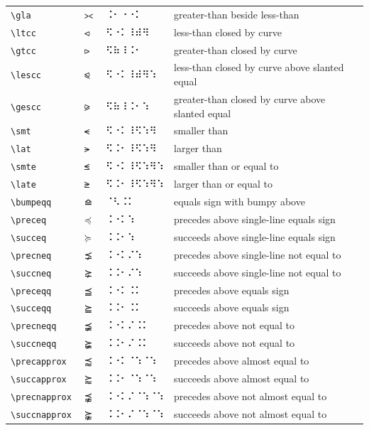 \documentclass[oneside]{article}
\begin{document}
\begin{longtable}{llll}
\verb|\gla| & $\gla$ &   ⠨⠂⠐⠐⠅   & {greater-than beside less-than} \\[2ex]
\verb|\ltcc| & $\ltcc$ &   ⠫⠐⠅⠸⠾⠻   & {less-than closed by curve} \\[2ex]
\verb|\gtcc| & $\gtcc$ &   ⠫⠷⠸⠨⠂   & {greater-than closed by curve} \\[2ex]
\verb|\lescc| & $\lescc$ &   ⠫⠐⠅⠸⠾⠻⠱   & {less-than closed by curve above slanted equal} \\[2ex]
\verb|\gescc| & $\gescc$ &   ⠫⠷⠸⠨⠂⠱   & {greater-than closed by curve above slanted equal} \\[2ex]
\verb|\smt| & $\smt$ &   ⠫⠐⠅⠸⠫⠱⠻   & {smaller than} \\[2ex]
\verb|\lat| & $\lat$ &   ⠫⠨⠂⠸⠫⠱⠻   & {larger than} \\[2ex]
\verb|\smte| & $\smte$ &   ⠫⠐⠅⠸⠫⠱⠻⠱   & {smaller than or equal to} \\[2ex]
\verb|\late| & $\late$ &   ⠫⠨⠂⠸⠫⠱⠻⠱   & {larger than or equal to} \\[2ex]
\verb|\bumpeqq| & $\bumpeqq$ &   ⠈⠣⠨⠅   & {equals sign with bumpy above} \\[2ex]
\verb|\preceq| & $\preceq$ &   ⠨⠐⠅⠱   & {precedes above single-line equals sign} \\[2ex]
\verb|\succeq| & $\succeq$ &   ⠨⠨⠂⠱   & {succeeds above single-line equals sign} \\[2ex]
\verb|\precneq| & $\precneq$ &   ⠨⠐⠅⠌⠱   & {precedes above single-line not equal to} \\[2ex]
\verb|\succneq| & $\succneq$ &   ⠨⠨⠂⠌⠱   & {succeeds above single-line not equal to} \\[2ex]
\verb|\preceqq| & $\preceqq$ &   ⠨⠐⠅⠨⠅   & {precedes above equals sign} \\[2ex]
\verb|\succeqq| & $\succeqq$ &   ⠨⠨⠂⠨⠅   & {succeeds above equals sign} \\[2ex]
\verb|\precneqq| & $\precneqq$ &   ⠨⠐⠅⠌⠨⠅   & {precedes above not equal to} \\[2ex]
\verb|\succneqq| & $\succneqq$ &   ⠨⠨⠂⠌⠨⠅   & {succeeds above not equal to} \\[2ex]
\verb|\precapprox| & $\precapprox$ &   ⠨⠐⠅⠈⠱⠈⠱   & {precedes above almost equal to} \\[2ex]
\verb|\succapprox| & $\succapprox$ &   ⠨⠨⠂⠈⠱⠈⠱   & {succeeds above almost equal to} \\[2ex]
\verb|\precnapprox| & $\precnapprox$ &   ⠨⠐⠅⠌⠈⠱⠈⠱   & {precedes above not almost equal to} \\[2ex]
\verb|\succnapprox| & $\succnapprox$ &   ⠨⠨⠂⠌⠈⠱⠈⠱   & {succeeds above not almost equal to} \\[2ex]

\end{longtable}
\end{document}
